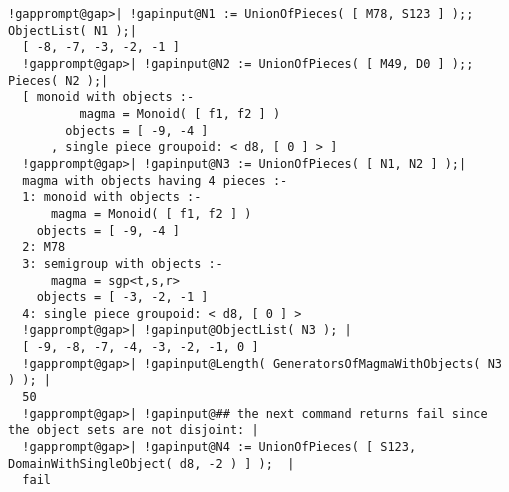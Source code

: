 \documentclass[a4paper,11pt]{report}
\begin{document}
{{\begin{Verbatim}[commandchars=!@|,fontsize=\small,frame=single,label=Example]
  !gapprompt@gap>| !gapinput@N1 := UnionOfPieces( [ M78, S123 ] );;  ObjectList( N1 );|
  [ -8, -7, -3, -2, -1 ]
  !gapprompt@gap>| !gapinput@N2 := UnionOfPieces( [ M49, D0 ] );;  Pieces( N2 );|
  [ monoid with objects :-
          magma = Monoid( [ f1, f2 ] )
        objects = [ -9, -4 ]
      , single piece groupoid: < d8, [ 0 ] > ]
  !gapprompt@gap>| !gapinput@N3 := UnionOfPieces( [ N1, N2 ] );|
  magma with objects having 4 pieces :-
  1: monoid with objects :-
      magma = Monoid( [ f1, f2 ] )
    objects = [ -9, -4 ]
  2: M78
  3: semigroup with objects :-
      magma = sgp<t,s,r>
    objects = [ -3, -2, -1 ]
  4: single piece groupoid: < d8, [ 0 ] >
  !gapprompt@gap>| !gapinput@ObjectList( N3 ); |
  [ -9, -8, -7, -4, -3, -2, -1, 0 ]
  !gapprompt@gap>| !gapinput@Length( GeneratorsOfMagmaWithObjects( N3 ) ); |
  50
  !gapprompt@gap>| !gapinput@## the next command returns fail since the object sets are not disjoint: |
  !gapprompt@gap>| !gapinput@N4 := UnionOfPieces( [ S123, DomainWithSingleObject( d8, -2 ) ] );  |
  fail
  
\end{Verbatim}
 }

 }

            
\end{document}
